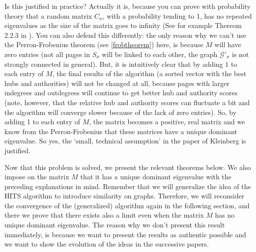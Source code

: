 \documentclass[a4paper,11pt]{report}
\newcommand{\graf}{\mathscr{G}}
\begin{document}
Is this justified in practice? Actually it is, because you can prove with probability theory that a random 
matrix $C_n$,  with a probability tending to 1, has no repeated eigenvalues as the size of the matrix goes to infinity (See for example Thereom 2.2.3 in \cite{random}).  You can also defend this differently: the only reason why we can't use the 
Perron-Frobenius theorem (see \ref{frobtheorem}) here, is because $M$ will have 
zero entries (not all pages in $S_\sigma$ will be linked to each other, the graph $\graf'_\sigma$ is not strongly connected in general). But,
it is intuitively clear that by adding 1 to each entry of $M$, the final results 
of the algorithm (a sorted vector with the best hubs and authorities) will not 
be changed at all, because pages with larger indegrees and outdegrees will continue to get better hub and authority scores (note, however, that the relative hub and authority scores can fluctuate a bit and the algorithm will converge slower because of the lack of zero 
entries). So, by adding 1 to each entry of $M$, the matrix becomes a positive, real matrix 
and we know from the Perron-Frobenius that these matrices have a unique dominant 
eigenvalue. So yes, the `small, technical assumption' in the paper of Kleinberg 
is justified.

Now that this problem is solved, we present the relevant theorems below. We also 
impose on the matrix $M$ that it has a unique dominant eigenvalue with the preceding explanations in mind. 
Remember that we will generalize the idea of the HITS algorithm to introduce 
similarity on graphs. Therefore, we will reconsider the 
convergence of the (generalized) algorithm again in the following section, and 
there we prove that there exists also a limit even when the matrix $M$ has no unique 
dominant eigenvalue. The reason why we don't present this result immediately, is 
because we want to present the results as authentic possible and we want to show 
the evolution of the ideas in the successive papers.
\end{document}
